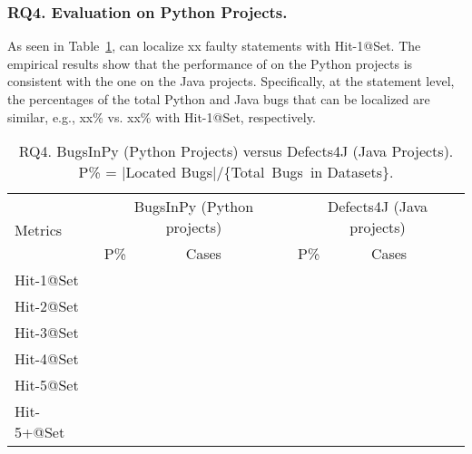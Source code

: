 \subsubsection{\bf RQ4. Evaluation on Python Projects.}
As seen in Table~\ref{RQ4}, {\tool} can localize xx faulty
statements with Hit-1@Set. The empirical results show that the performance of
{\tool} on the Python projects is consistent with the one on the Java
projects. Specifically, at the statement level, the percentages of the
total Python and Java bugs that can be localized are similar, e.g., xx\%
vs. xx\% with Hit-1@Set, respectively. 


\begin{table}[t]
	\caption{RQ4. BugsInPy (Python Projects) versus Defects4J (Java Projects). P\% = $|$Located Bugs$|$/\{Total~Bugs~in Datasets\}.}
	\vspace{-5pt}
	{\small
		\begin{center}
			\tabcolsep 2.7pt
			\begin{tabular}{p{1.4cm}<{\centering}|p{1.55cm}<{\centering}p{1.55cm}<{\centering}|p{1.55cm}<{\centering}p{1.55cm}<{\centering}}\hline\cline{2-5}	
				
		\multirow{2}{*}{Metrics}& \multicolumn{2}{c|}{BugsInPy (Python projects)} & \multicolumn{2}{c}{Defects4J (Java projects)}\\\cline{2-5}
				 & P\%& Cases &P\%& Cases \\ \hline
				
				Hit-1@Set &   &  &&\\ 
				\hline
				 
			    Hit-2@Set &   & &&\\
				\hline
				
				
				Hit-3@Set &   & &&\\
				\hline
				
				Hit-4@Set &   & &&\\
				\hline
				
				Hit-5@Set &   & &&\\
				\hline
				
				Hit-5+@Set &   & &&\\
				\hline
			\end{tabular}
			\label{RQ4}
		\end{center}
	}
	\vspace{-10pt}
\end{table}



